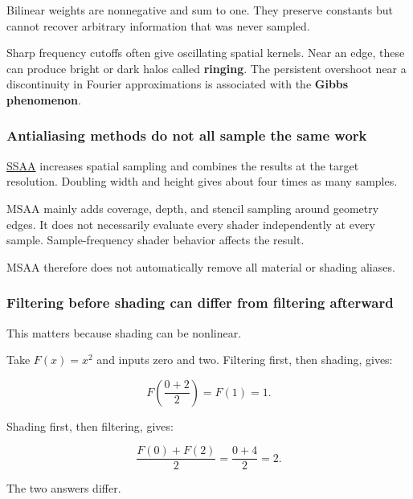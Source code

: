 Bilinear weights are nonnegative and sum to one. They preserve constants but cannot recover arbitrary information that was never sampled.

Sharp frequency cutoffs often give oscillating spatial kernels. Near an edge, these can produce bright or dark halos called \textbf{ringing}. The persistent overshoot near a discontinuity in Fourier approximations is associated with the \textbf{Gibbs phenomenon}.

\subsubsection{Antialiasing methods do not all sample the same work}\label{04-visual-computing-ii-ch042-antialiasing-methods-do-not-all-sample-the-same-work}

\hypertarget{04-visual-computing-ii-ch042-antialiasing-methods-do-not-all-sample-the-same-work}{}

\hyperref[appendix-4192b2bdd21e]{SSAA} increases spatial sampling and combines the results at the target resolution. Doubling width and height gives about four times as many samples.

MSAA mainly adds coverage, depth, and stencil sampling around geometry edges. It does not necessarily evaluate every shader independently at every sample. Sample-frequency shader behavior affects the result.

MSAA therefore does not automatically remove all material or shading aliases.

\subsubsection{Filtering before shading can differ from filtering afterward}\label{04-visual-computing-ii-ch042-filtering-before-shading-can-differ-from-filtering-afterward}

\hypertarget{04-visual-computing-ii-ch042-filtering-before-shading-can-differ-from-filtering-afterward}{}

This matters because shading can be nonlinear.

Take \(F(x)=x^2\) and inputs zero and two. Filtering first, then shading, gives:

\[
F\left(\frac{0+2}{2}\right)=F(1)=1.
\]

Shading first, then filtering, gives:

\[
\frac{F(0)+F(2)}2=\frac{0+4}2=2.
\]

The two answers differ.

